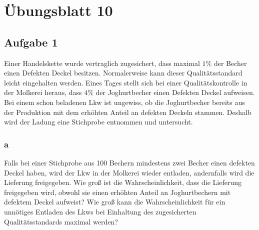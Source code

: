 \chapter{Übungsblatt 10}

\section{Aufgabe 1}

Einer Handelskette wurde vertraglich zugesichert, dass maximal $1\%$ der Becher
einen Defekten Deckel besitzen. Normalerweise kann dieser Qualitätsstandard
leicht eingehalten werden. Eines Tages stellt sich bei einer
Qualitäts\-kontrolle in der Molkerei heraus, dass $4\%$ der Joghurtbecher einen
Defekten Deckel aufweisen. Bei einem schon beladenen Lkw ist ungewiss, ob die
Joghurtbecher bereits aus der Produktion mit dem erhöhten Anteil an defekten
Deckeln stammen. Deshalb wird der Ladung eine Stichprobe entnommen und
untersucht.

\subsection{a}

Falls bei einer Stichprobe aus 100 Bechern mindestens zwei Becher einen
defekten Deckel haben, wird der Lkw in der Molkerei wieder entladen,
andernfalls wird die Lieferung freigegeben. Wie groß ist die
Wahrscheinlichkeit, dass die Lieferung freigegeben wird, obwohl sie einen
erhöhten Anteil an Joghurtbechern mit defektem Deckel aufweist? Wie groß kann
die Wahrscheinlichkeit für ein unnötiges Entladen des Lkws bei Einhaltung des
zugesicherten Qualitätsstandards maximal werden?

